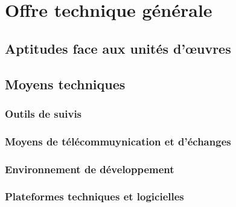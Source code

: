 	\chapter{Offre technique générale}
	
	
	

	\section{Aptitudes face aux unités d'œuvres}
	\section{Moyens techniques}
	\subsection{Outils de suivis}
	\subsection{Moyens de télécommuynication et d'échanges}
	\subsection{Environnement de développement}
	\subsection{Plateformes techniques et logicielles}